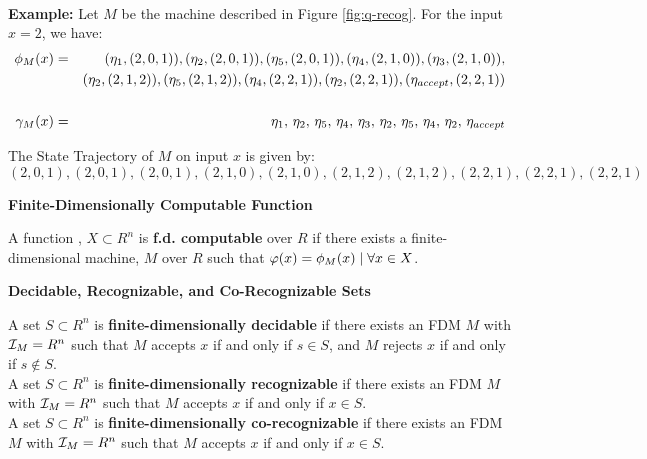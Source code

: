 \\

\textbf{Example: } Let $M$ be the machine described in Figure
\ref{fig:q-recog}. For the input $x = 2$, we have:
\begin{eqnarray*}
  \phi_M(x) &=& (\eta_1, (2,0,1)), (\eta_2, (2,0,1)), (\eta_5, (2,0,1)), (\eta_4, (2,1,0)), (\eta_3, (2,1,0)),\\
            &&  (\eta_2, (2,1,2)), (\eta_5, (2,1,2)), (\eta_4, (2,2,1)), (\eta_2, (2,2,1)), (\eta_{accept}, (2,2,1))\\
            && \\
  \gamma_M(x) &=& \eta_1,\, \eta_2,\, \eta_5,\, \eta_4,\, \eta_3,\, \eta_2,\, \eta_5,\, \eta_4,\, \eta_2,\, \eta_{accept}
\end{eqnarray*}

The State Trajectory of $M$ on input $x$ is given by:
$$(2,0,1), (2,0,1), (2,0,1), (2,1,0), (2,1,0), (2,1,2), (2,1,2), (2,2,1), (2,2,1), (2,2,1)$$

\begin{definition}{\textbf{Finite-Dimensionally Computable Function}}
  
  A function , $X \subset R^n$ is
  \textbf{f.d. computable} over $R$ if there exists a
  finite-dimensional machine, $M$ over $R$ such that 
  $\varphi(x) = \phi_M(x) \mid \forall x \in X$.
  
\end{definition}

\begin{definition}{\textbf{Decidable, Recognizable, and Co-Recognizable Sets}}
  
  A set $S \subset R^n$ is \textbf{finite-dimensionally decidable} if
  there exists an FDM $M$ with $\mathcal{I}_M = R^n$ such that $M$
  accepts $x$ if and only if $s \in S$, and $M$ rejects $x$ if and
  only if $s \notin S$.\\

  A set $S \subset R^n$ is \textbf{finite-dimensionally recognizable}
  if there exists an FDM $M$ with $\mathcal{I}_M = R^n$ such that $M$
  accepts $x$ if and only if $x \in S$.\\

  A set $S \subset R^n$ is \textbf{finite-dimensionally
    co-recognizable} if there exists an FDM $M$ with $\mathcal{I}_M =
  R^n$ such that $M$ accepts $x$ if and only if $x \in S$.
\end{definition}
  
